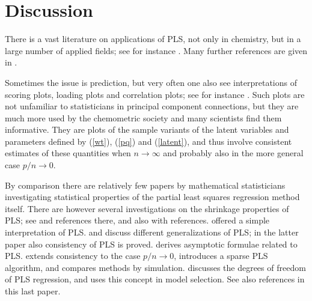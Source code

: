 \documentclass[a4paper, 11pt]{article}
\begin{document}



\section{Discussion}
There is a vast literature on applications of PLS, not only in chemistry, but in a large number of applied fields; see for instance \citet{boulesteix2007partial}. Many further references are given in \citet{mehmood2016diversity}.

Sometimes the issue is prediction, but very often one also see interpretations of scoring plots, loading plots and correlation plots; see for instance \citet{martens2001multivariate}. Such plots are not unfamiliar to statisticians in principal component connections, but they are much more used by the chemometric society and many scientists find them informative. They are plots of the sample variants of the latent variables and parameters defined by (\ref{wt}), (\ref{pq}) and (\ref{latent}), and thus involve consistent estimates of these quantities when $n\rightarrow\infty$ and probably also in the more general case $p/n\rightarrow 0$.

By comparison there are relatively few papers by mathematical statisticians
investigating statistical properties of the partial least squares regression
method itself. There are however several investigations on the shrinkage
properties of PLS; see \citet{kramer2007overview} and references there, and also \citet{foschigeometry} with references. \citet{garthwaite1994interpretation} offered a simple interpretation of PLS. \citet{stone1990continuum} and \citet{naik2000partial} discuss different generalizations of PLS; in the latter paper also consistency of PLS is proved. \citet{stoica1998partial} derives asymptotic formulae related to PLS. \citet{chun2010sparse} extends consistency to the case $p/n\rightarrow 0$, introduces a sparse PLS algorithm, and compares methods by simulation. \citet{kramer2012degrees} discusses the degrees of freedom of PLS regression, and uses this concept in model selection. See also references in this last paper.
\end{document}

